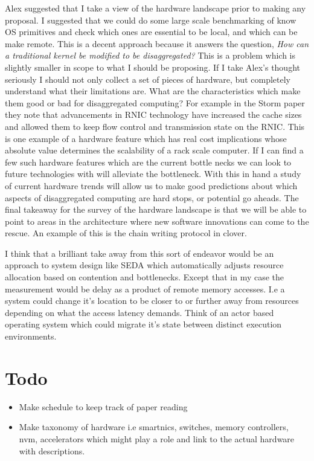 Alex suggested that I take a view of the hardware landscape prior to making
any proposal. I suggested that we could do some large scale benchmarking of
know OS primitives and check which ones are essential to be local, and which
can be make remote. This is a decent approach because it answers the
question, \textit{How can a traditional kernel be modified to be
disaggregated?} This is a problem which is slightly smaller in scope to what
I should be proposing. If I take Alex's thought seriously I should not only
collect a set of pieces of hardware, but completely understand what their
limitations are. What are the characteristics which make them good or bad for
disaggregated computing? For example in the Storm paper~\cite{storm} they
note that advancements in RNIC technology have increased the cache sizes and
allowed them to keep flow control and transmission state on the RNIC. This is
one example of a hardware feature which has real cost implications whose
absolute value determines the scalability of a rack scale computer. If I can
find a few such hardware features which are the current bottle necks we can
look to future technologies with will alleviate the bottleneck. With this in
hand a study of current hardware trends will allow us to make good
predictions about which aspects of disaggregated computing are hard stops, or
potential go aheads. The final takeaway for the survey of the hardware
landscape is that we will be able to point to areas in the architecture where
new software innovations can come to the rescue. An example of this is the
chain writing protocol in clover.

I think that a brilliant take away from this sort of endeavor would be an
approach to system design like SEDA which automatically adjusts resource
allocation based on contention and bottlenecks. Except that in my case the
measurement would be delay as a product of remote memory accesses. I.e a
system could change it's location to be closer to or further away from
resources depending on what the access latency demands. Think of an actor
based operating system which could migrate it's state between distinct
execution environments.

\section{Todo} 
\label{sec:todo}
\begin{itemize} 

     \item{Make schedule to keep track of paper reading}

    \item {Make taxonomy of hardware i.e smartnics, switches, memory
    controllers, nvm, accelerators which might play a role and link to the
    actual hardware with descriptions.}

\end{itemize}

